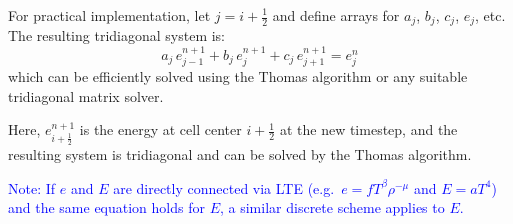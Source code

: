 \documentclass[11pt]{article}
\begin{document}
\begin{enumerate}
  For practical implementation, let $j = i+\frac{1}{2}$ and define arrays for $a_j$, $b_j$, $c_j$, $e_j$, etc. The resulting tridiagonal system is:
  \begin{equation}
    a_j\, e_{j-1}^{n+1} + b_j\, e_j^{n+1} + c_j\, e_{j+1}^{n+1} = e_j^n
  \end{equation}
  which can be efficiently solved using the Thomas algorithm or any suitable tridiagonal matrix solver.


  Here, $e_{i+\frac{1}{2}}^{n+1}$ is the energy at cell center $i+\frac{1}{2}$ at the new timestep, and the resulting system is tridiagonal and can be solved by the Thomas algorithm.

  \textcolor{blue}{Note: If $e$ and $E$ are directly connected via LTE (e.g.\ $e=fT^\beta \rho^{-\mu}$ and $E=aT^4$) and the same equation holds for $E$, a similar discrete scheme applies to $E$.}
\end{enumerate}
\end{document}
